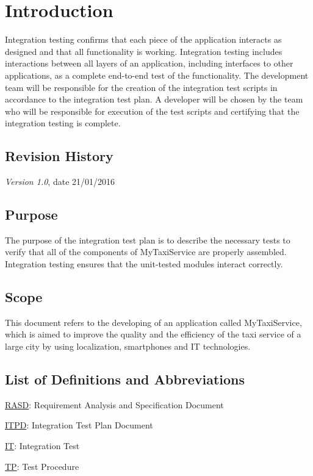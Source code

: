 \chapter{Introduction} \label{chap1}
Integration testing confirms that each piece of the application interacts as designed and that all functionality is working. Integration testing includes interactions between all layers of an application, including interfaces to other applications, as a complete end-to-end test of the functionality.
The development team will be responsible for the creation of the integration test scripts in accordance to the integration test plan.  A developer will be chosen by the team who will be responsible for execution of the test scripts and certifying that the integration testing is complete.

\section{Revision History}
\textit{Version 1.0}, date 21/01/2016

\section{Purpose}
The purpose of the integration test plan is to describe the necessary tests to verify that all of the components of MyTaxiService are properly assembled.  Integration testing ensures that the unit-tested modules interact correctly.

\section{Scope}
This document refers to the developing of an application called MyTaxiService, which is aimed to improve the quality and the efficiency of the taxi service of a large city by using localization, smartphones and IT technologies.

\section{List of Definitions and Abbreviations}
\begin{description}
	\item \underline{RASD}: Requirement Analysis and Specification Document
	\item \underline{ITPD}: Integration Test Plan Document
	\item \underline{IT}: Integration Test
	\item \underline{TP}: Test Procedure 
\end{description}

